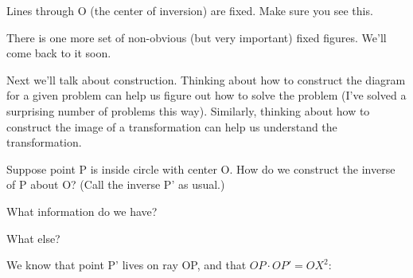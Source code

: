 Lines through O (the center of inversion) are fixed.  Make sure you see this.

There is one more set of non-obvious (but very important) fixed figures.  We'll come back to it soon.

Next we'll talk about construction.  Thinking about how to construct the diagram for a given problem can help us figure out how to solve the problem (I've solved a surprising number of problems this way).  Similarly, thinking about how to construct the image of a transformation can help us understand the transformation.

Suppose point P is inside circle with center O.  How do we construct the inverse of P about O?  (Call the inverse P' as usual.)

What information do we have?




What else?









We know that point P' lives on ray OP, and that $OP \cdot OP' = OX^2$:


